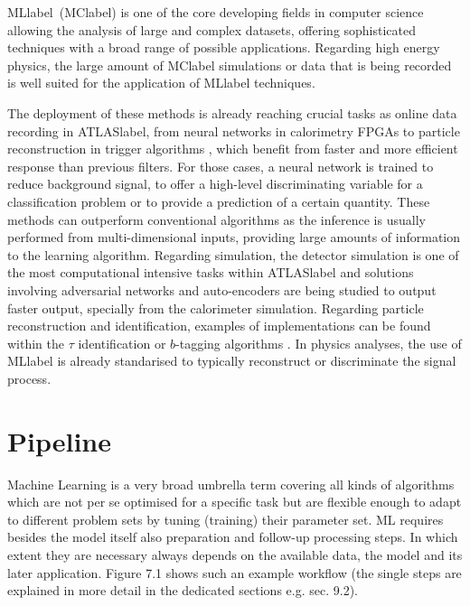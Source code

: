 \acrlong{MLlabel}~(\acrshort{MClabel}) is one of the core developing fields in computer science allowing the analysis of large and complex datasets, offering sophisticated techniques with a broad range of possible applications. Regarding high energy physics, the large amount of \acrshort{MClabel} simulations or data that is being recorded is well suited for the application of \acrshort{MLlabel} techniques.

The deployment of these methods is already reaching crucial tasks as online data recording in \acrshort{ATLASlabel}, from neural networks in calorimetry FPGAs  %
to particle reconstruction in trigger algorithms %
, which benefit from faster and more efficient response than previous filters. For those cases, a neural network is trained to reduce background signal, to offer a high-level discriminating variable for a classification problem or to provide a prediction of a certain quantity. These methods can outperform conventional algorithms as the inference is usually performed from multi-dimensional inputs, providing large amounts of information to the learning algorithm. Regarding simulation, the detector simulation is one of the most computational intensive tasks within \acrshort{ATLASlabel} and solutions involving adversarial networks and auto-encoders are being studied to output faster output, specially from the calorimeter simulation. Regarding particle reconstruction and identification, examples of implementations can be found within the $\tau$ identification %
 or $b$-tagging algorithms %
 . In physics analyses, the use of \acrshort{MLlabel} is already standarised to typically reconstruct or discriminate the signal process.

\section{Pipeline}

Machine Learning is a very broad umbrella term covering all kinds of algorithms which are not per
se optimised for a specific task but are flexible enough to adapt to different problem sets by tuning
(training) their parameter set.
ML requires besides the model itself also preparation and follow-up processing steps. In which
extent they are necessary always depends on the available data, the model and its later application.
Figure 7.1 shows such an example workflow (the single steps are explained in more detail in the
dedicated sections e.g. sec. 9.2).

